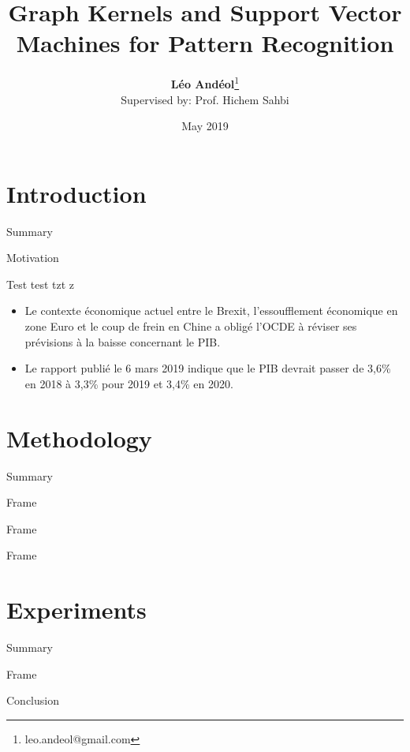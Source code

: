 \documentclass[compress]{beamer}
\title[Graph Kernels]{Graph Kernels and Support Vector Machines for Pattern Recognition}
\author[Léo Andéol]{\textbf{Léo Andéol}\thanks{leo.andeol@gmail.com}\\ \footnotesize Supervised by: Prof. Hichem Sahbi}
\institute[Sorbonne Uni.]{Master DAC - Sorbonne Université}
\date{May 2019}
\begin{document}
\begin{frame}
  \titlepage
\end{frame}

\section{Introduction}
\begin{frame}{Summary}
  \tableofcontents[currentsection]
\end{frame}
\begin{frame}{Motivation}
\begin{block}{Test}
test tzt  z 
\end{block}
\begin{itemize}
    \item Le contexte économique actuel entre le Brexit, l'essoufflement économique en zone Euro et le coup de frein en Chine a obligé l'OCDE à réviser ses prévisions à la baisse concernant le PIB.
    \pause
    \item Le rapport publié le 6 mars 2019 indique que le PIB devrait passer de 3,6\% en 2018 à 3,3\%
pour 2019 et 3,4\% en 2020.
\end{itemize} 
\end{frame}


\section{Methodology}
\begin{frame}{Summary}
  \tableofcontents[currentsection]
\end{frame}
\begin{frame}{Frame}
    
\end{frame}
\begin{frame}{Frame}
    
\end{frame}
\begin{frame}{Frame}
    
\end{frame}


\section{Experiments}
\begin{frame}{Summary}
  \tableofcontents[currentsection]
\end{frame}
\begin{frame}{Frame}
    
\end{frame}

\begin{frame}{Conclusion}
    
\end{frame}
\end{document}

